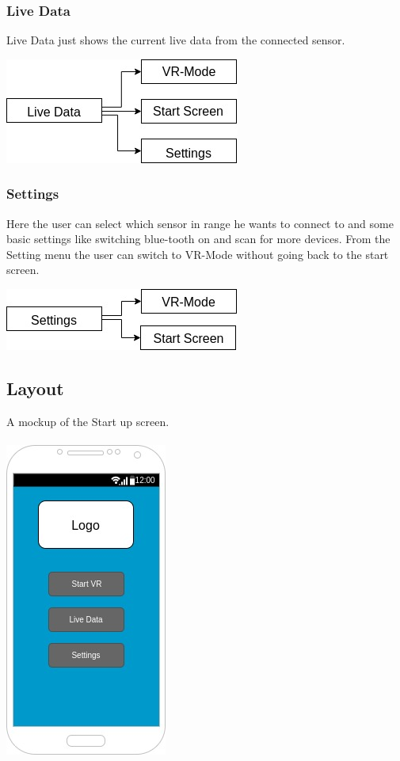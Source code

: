 \subsubsection{Live Data}
Live Data just shows the current live data from the connected sensor.

\includegraphics[scale=0.5]{pics/Live_Data.jpg}

\newpage

\subsubsection{Settings}

Here the user can select which sensor in range he wants to connect to and some basic settings like switching blue-tooth on and scan for more devices.
From the Setting menu the user can switch to VR-Mode without going back to the start screen.

\includegraphics[scale=0.5]{pics/Settings.jpg}

\subsection{Layout}

A mockup of the Start up screen. 
\\
\\
\includegraphics[scale=0.5]{pics/startScreen_mockup.jpg}
\\

